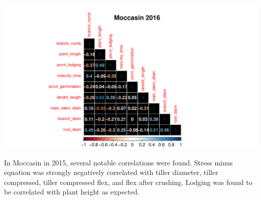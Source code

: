 \documentclass[11pt]{article}
\begin{document}
\begin{knitrout}\footnotesize
{}\color{fgcolor}

{\centering \includegraphics[width=\maxwidth]{figure/moc-1} 

}



\end{knitrout}
\pagebreak
In Moccasin in 2015, several notable correlations were found. Stress minus equation was strongly negatively correlated with tiller diameter, tiller compressed, tiller compressed flex, and flex after crushing. Lodging was found to be correlated with plant height as expected. 
\end{document}
